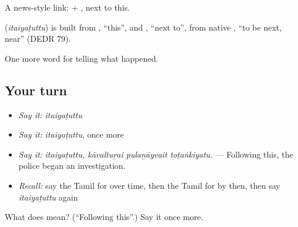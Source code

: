 A news-style link:  + , next to this.

\begin{cousinweb}
\textbf{} (\emph{itaiyaṭuttu}) is built from , \textquotedblleft{}this\textquotedblright{}, and , \textquotedblleft{}next to\textquotedblright{}, from native , \textquotedblleft{}to be next, near\textquotedblright{} (DEDR 79).
\end{cousinweb}

\begin{grammarlens}[title={What you've built}]
One more word for telling what happened.
\end{grammarlens}

\subsection*{Your turn}
\begin{itemize}
\raggedright
  \item \emph{Say it:} \emph{itaiyaṭuttu}
  \item \emph{Say it:} \emph{itaiyaṭuttu}, once more
  \item \emph{Say it:} \emph{itaiyaṭuttu, kāvaltuṟai pulaṉāyvait toṭaṅkiyatu.} — Following this, the police began an investigation.
  \item \emph{Recall:} say the Tamil for over time, then the Tamil for by then, then say \emph{itaiyaṭuttu} again
\end{itemize}

\begin{tcolorbox}[breakable,colback=teal!4,colframe=teal!35!black,title={Before you move on}]
What does  mean? (\textquotedblleft{}Following this\textquotedblright{}.) Say it once more.
\end{tcolorbox}
